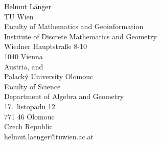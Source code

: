 \documentclass[12pt]{article}
\begin{document}
Helmut L\"anger \\
TU Wien \\
Faculty of Mathematics and Geoinformation \\
Institute of Discrete Mathematics and Geometry \\
Wiedner Hauptstra\ss e 8-10 \\
1040 Vienna \\
Austria, and \\
Palack\'y University Olomouc \\
Faculty of Science \\
Department of Algebra and Geometry \\
17.\ listopadu 12 \\
771 46 Olomouc \\
Czech Republic \\
helmut.laenger@tuwien.ac.at
\end{document}
